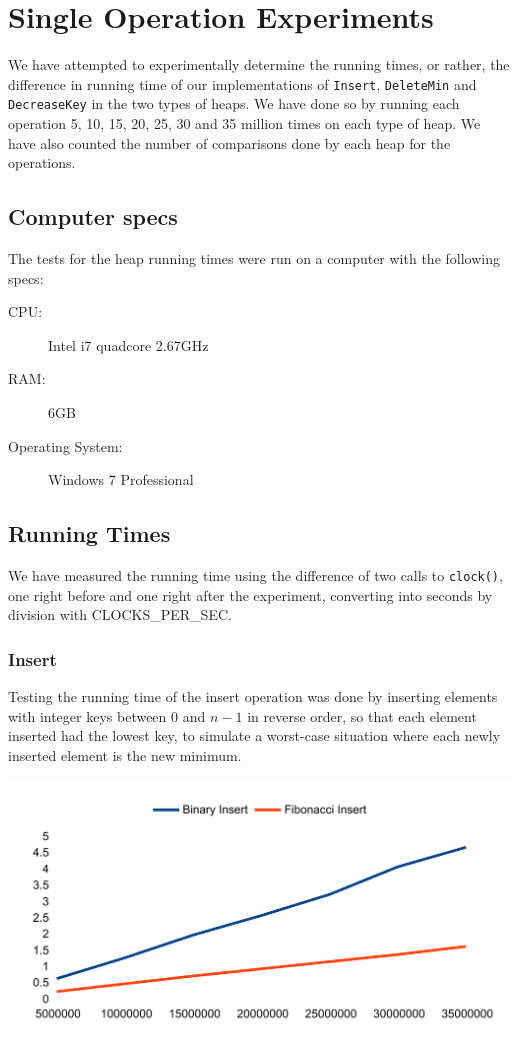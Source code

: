 \section{Single Operation Experiments}
We have attempted to experimentally determine the running times, or rather, the difference in running time of our implementations of \verb#Insert#, \verb#DeleteMin# and \verb#DecreaseKey# in the two types of heaps. We have done so by running each operation 5, 10, 15, 20, 25, 30 and 35 million times on each type of heap. We have also counted the number of comparisons done by each heap for the operations.

\subsection{Computer specs}
The tests for the heap running times were run on a computer with the following specs:

\begin{description}
\item[CPU:] Intel i7 quadcore 2.67GHz
\item[RAM:] 6GB
\item[Operating System:] Windows 7 Professional 
\end{description}

\subsection{Running Times}
We have measured the running time using the difference of two calls to \verb#clock()#, one right before and one right after the experiment, converting into seconds by division with CLOCKS\_PER\_SEC.

\subsubsection{Insert}
Testing the running time of the insert operation was done by inserting elements with integer keys between $0$ and $n-1$ in reverse order, so that each element inserted had the lowest key, to simulate a worst-case situation where each newly inserted element is the new minimum.

\includegraphics[width=\textwidth]{graphs/insert_graph.pdf}


